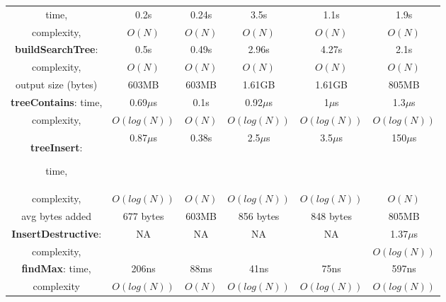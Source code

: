 \documentclass[showabstract,showacknowledgments,showpreface,showdedication,school]{iuphd}
\theoremstyle{nonumberplain}
\begin{document}
\begin{table}
\begin{center}
\begin{tabular}{ |c|c|c|c|c|c| }
                time,               & 0.2s      & 0.24s   & 3.5s   &  1.1s   &  1.9s       \\
                complexity,         & $O(N)$    & $O(N)$  & $O(N)$ & $O(N)$  &  $O(N)$ \\

                \hline
                \hline
                {\bf buildSearchTree}:

                                    & 0.5s      & 0.49s     & 2.96s   &  4.27s   &  2.1s         \\
                    complexity,          & $O(N)$    & $O(N)$    & $O(N)$  & $O(N)$   &  $O(N)$ \\
                    output size (bytes)  & 603MB     & 603MB     & 1.61GB  &  1.61GB  &  805MB      \\

                    \hline

                    {\bf treeContains}:
                    time,                & 0.69$\mu$s   & 0.1s  & 0.92$\mu$s  &  1$\mu$s    & 1.3$\mu$s \\
                    complexity,          & $O(log(N))$ & $O(N)$ & $O(log(N))$ & $O(log(N))$ & $O(log(N))$ \\
                    \hline

                    {\bf treeInsert}:

                    time,                & 0.87$\mu$s  & 0.38s  & 2.5$\mu$s   &  3.5$\mu$s   &  150$\mu$s  \\
                    complexity,          & $O(log(N))$ & $O(N)$ & $O(log(N))$ & $O(log(N))$  & $O(N)$  \\
                    avg bytes added      & 677 bytes        &  603MB  & 856 bytes   &  848 bytes  & 805MB  \\
                    \hline

                    {\bf InsertDestructive}:
                                         &  NA   & NA   & NA   & NA  &  1.37$\mu$s       \\
                    complexity,          &       &      &      &     & $O(log(N))$ \\

                    \hline

                    {\bf findMax}:
                    time,                & 206ns        & 88ms    & 41ns        & 75ns         & 597ns        \\
                    complexity           & $O(log(N))$  & $O(N)$  & $O(log(N))$ & $O(log(N))$  & $O(log(N))$  \\
                    \hline


\end{tabular}
\end{center}
\end{table}
\end{document}
